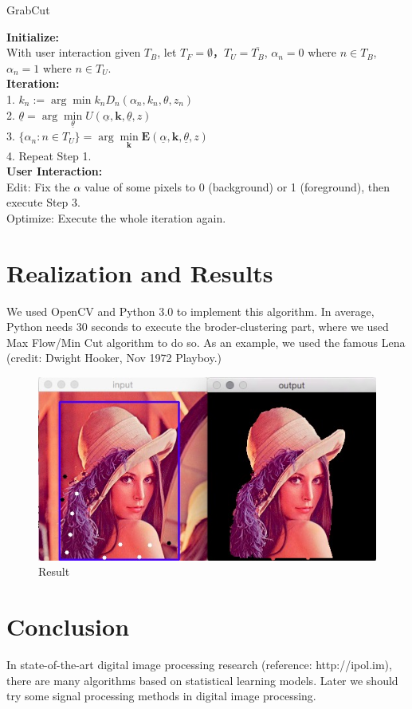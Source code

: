 \documentclass[a4paper, 11pt, nofonts, nocap, fancyhdr, hyperref, UTF8]{ctexart}
\begin{document}
\begin{algorithm}[H]
\caption{GrabCut}\label{GC}
\textbf{Initialize:}\\With user interaction given $T_B$, let $T_F = \emptyset$，$T_U = \overline{T_B}$, $\alpha_n = 0$ where $n \in T_B$, $\alpha_n = 1$ where $n \in T_U$.\\
\textbf{Iteration:}\\
1. $k_n := \arg \min \limits{k_n} D_n(\alpha_n,k_n,\theta, z_n)$\\
2. $\underline{\theta}=\arg \min \limits_{\underline{\theta}} U(\underline{\alpha},\textbf{k},\underline{\theta},z)$\\
3. $\{\alpha_n:n \in T_U\} = \arg \min \limits_{\textbf{k}} \textbf{E}(\underline{\alpha},\textbf{k},\underline{\theta},z)$\\
4. Repeat Step 1.\\
\textbf{User Interaction:}\\
Edit: Fix the $\alpha$ value of some pixels to 0 (background) or 1 (foreground), then execute Step 3. \\
Optimize: Execute the whole iteration again.
\end{algorithm}


\section{Realization and Results}
We used OpenCV and Python 3.0 to implement this algorithm. In average, Python needs 30 seconds to execute the broder-clustering part, where we used Max Flow/Min Cut algorithm to do so. As an example, we used the famous Lena (credit: Dwight Hooker, Nov 1972 Playboy.)

\begin{figure}[H]
    \centering
    \includegraphics[width=\textwidth]{lena.jpg}
    \caption{Result}
\end{figure}

\section{Conclusion}
In state-of-the-art digital image processing research (reference: http://ipol.im), there are many algorithms based on statistical learning models. Later we should try some signal processing methods in digital image processing.

% 
% 
\end{document}
